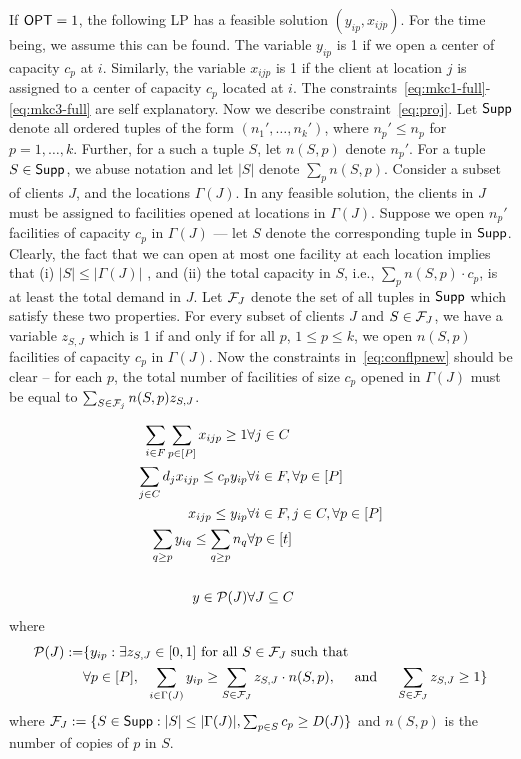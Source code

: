 If $\mathsf{OPT} = 1$, the following LP has a feasible solution $(y_{ip}, x_{ijp})$. For the time being, we assume this can be found. The variable $y_{ip}$ is 1 if we open a
center of capacity $c_p$ at $i$. Similarly, the variable $x_{ijp}$ is 1 if the client at location $j$ is assigned to a center of capacity $c_p$ located at $i$. The constraints~\eqref{eq:mkc1-full}-\eqref{eq:mkc3-full} are self explanatory. Now we describe constraint~\eqref{eq:proj}.
Let $\mathsf{Supp}$ denote all ordered tuples of the form
$(n_1', \ldots, n_k')$, where $n_p' \leq n_p$ for $p=1, \ldots, k$. Further, for a such a tuple $S$, let $n(S,p)$ denote $n_p'$.
For a tuple  $S \in \mathsf{Supp}$, we abuse notation and let $|S|$ denote $\sum_p n(S,p)$.
 Consider a subset of clients $J$, and the locations $\Gamma(J)$.
 In any feasible solution, the clients in $J$ must be assigned to facilities opened at locations in $\Gamma(J)$.
 Suppose we open $n_p'$ facilities of capacity $c_p$ in $\Gamma(J)$ --- let $S$ denote the corresponding tuple
 in $\mathsf{Supp}$. Clearly, the fact that we can open at most one facility at each location implies that (i) $|S| \leq |\Gamma(J)|$ , and (ii) the total capacity in $S$, i.e.,
 $\sum_p n(S,p) \cdot c_p$, is at least the total demand in $J$. Let ${\cal F}_J$ denote the set of all tuples
 in $\mathsf{Supp}$ which satisfy these two properties. For every subset of clients $J$ and $S \in {\cal F}_J$, we have a variable $z_{S,J}$ which is 1 if and only if
 for all $p$, $1 \leq p \leq k$,
 we open $n(S,p)$ facilities of capacity $c_p$ in $\Gamma(J)$. Now the constraints in~\eqref{eq:conflpnew} should be clear -- for each $p$, the total number of
 facilities of size $c_p$ opened in $\Gamma(J)$ must be equal to $\sum_{S \in {\cal F}_j} n(S,p) z_{S,J}$.




\begin{eqnarray}
\sum_{i\in F} \sum_{p\in [P]}  x_{ijp} \geq 1 & \forall j\in C  \label{eq:mkc1-full} \\
\sum_{j\in C} d_j x_{ijp} \leq c_p y_{ip} & \forall i \in F, \forall p\in [P] \label{eq:mkc2-full} \\
x_{ijp} \leq y_{ip} & \forall i\in F, j\in C,\forall p\in [P] \label{eq:mkc3-full}\\
\sum_{q \geq p} y_{iq}   \leq \sum_{q\geq p} n_q & \forall p\in [t] \label{eq:mkc3-full}\\
\nonumber \\
y \in {\cal P}(J) & \forall J\subseteq C \label{eq:proj}
\end{eqnarray}
\noindent
where
\begin{eqnarray}
{\cal P}(J) := & \{ y_{ip}: \exists z_{S,J}\in [0,1] \textrm{ for all } S\in {\cal F}_J \textrm{ such that }  \notag \\
& \forall p\in [P], ~~ \sum_{i\in \Gamma(J)} y_{ip} \geq \sum_{S\in {\cal F}_{J}} z_{S,J}\cdot n(S,p), ~~~~ \textrm{and}~~~~ \sum_{S\in {\cal F}_{J}} z_{S,J} \geq 1 \} \label{eq:conflpnew}
\end{eqnarray}
where ${\cal F}_{J} := \{S\in \mathsf{Supp}: |S| \leq |\Gamma(J)|, \sum_{p\in S} c_p \geq D(J)\}$ and $n(S,p)$ is the number of copies of  $p$ in $S$. \bigskip



